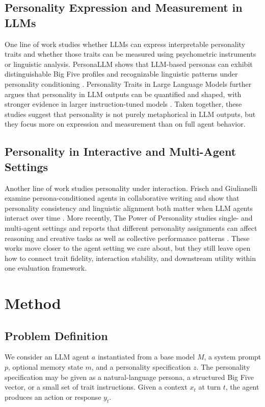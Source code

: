 \documentclass[11pt]{article}
\begin{document}
\subsection{Personality Expression and Measurement in LLMs}
One line of work studies whether LLMs can express interpretable personality traits and whether those traits can be measured using psychometric instruments or linguistic analysis. PersonaLLM shows that LLM-based personas can exhibit distinguishable Big Five profiles and recognizable linguistic patterns under personality conditioning \cite{personallm2023}. Personality Traits in Large Language Models further argues that personality in LLM outputs can be quantified and shaped, with stronger evidence in larger instruction-tuned models \cite{personalitytraitsllm2023}. Taken together, these studies suggest that personality is not purely metaphorical in LLM outputs, but they focus more on expression and measurement than on full agent behavior.

\subsection{Personality in Interactive and Multi-Agent Settings}
Another line of work studies personality under interaction. Frisch and Giulianelli examine persona-conditioned agents in collaborative writing and show that personality consistency and linguistic alignment both matter when LLM agents interact over time \cite{interaction2024}. More recently, The Power of Personality studies single- and multi-agent settings and reports that different personality assignments can affect reasoning and creative tasks as well as collective performance patterns \cite{powerofpersonality2025}. These works move closer to the agent setting we care about, but they still leave open how to connect trait fidelity, interaction stability, and downstream utility within one evaluation framework.

\section{Method}

\subsection{Problem Definition}
We consider an LLM agent $a$ instantiated from a base model $M$, a system prompt $p$, optional memory state $m$, and a personality specification $z$. The personality specification may be given as a natural-language persona, a structured Big Five vector, or a small set of trait instructions. Given a context $x_t$ at turn $t$, the agent produces an action or response $y_t$.
\end{document}

